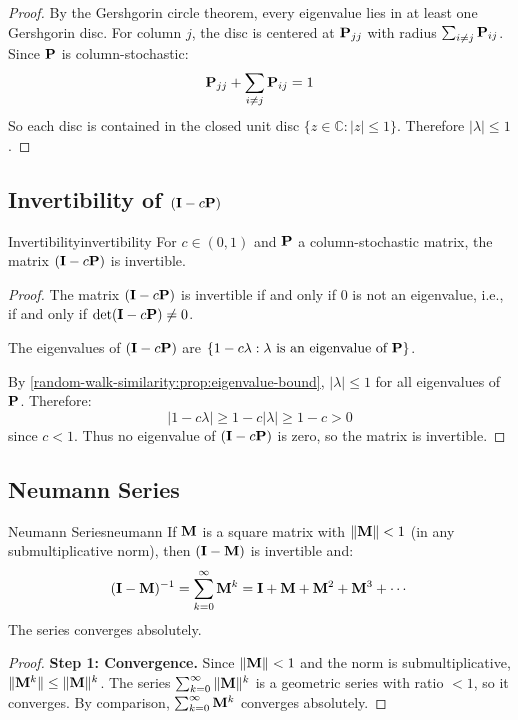 \begin{notechapter}
\begin{proof}
By the Gershgorin circle theorem, every eigenvalue lies in at least one Gershgorin disc. For column $j$, the disc is centered at $\mathbf{P}_{jj}$ with radius $\sum_{i \neq j} \mathbf{P}_{ij}$. Since $\mathbf{P}$ is column-stochastic:
\[
\mathbf{P}_{jj} + \sum_{i \neq j} \mathbf{P}_{ij} = 1
\]
So each disc is contained in the closed unit disc $\{z \in \mathbb{C} : |z| \leq 1\}$. Therefore $|\lambda| \leq 1$.
\end{proof}

\subsection{Invertibility of $(\mathbf{I} - c\mathbf{P})$}
\label{random-walk-similarity:app:invertibility}

\begin{proposition}{Invertibility}{invertibility}
For $c \in (0, 1)$ and $\mathbf{P}$ a column-stochastic matrix, the matrix $(\mathbf{I} - c\mathbf{P})$ is invertible.
\end{proposition}

\begin{proof}
The matrix $(\mathbf{I} - c\mathbf{P})$ is invertible if and only if $0$ is not an eigenvalue, i.e., if and only if $\det(\mathbf{I} - c\mathbf{P}) \neq 0$.

The eigenvalues of $(\mathbf{I} - c\mathbf{P})$ are $\{1 - c\lambda : \lambda \text{ is an eigenvalue of } \mathbf{P}\}$.

By \cref{random-walk-similarity:prop:eigenvalue-bound}, $|\lambda| \leq 1$ for all eigenvalues of $\mathbf{P}$. Therefore:
\[
|1 - c\lambda| \geq 1 - c|\lambda| \geq 1 - c > 0
\]
since $c < 1$. Thus no eigenvalue of $(\mathbf{I} - c\mathbf{P})$ is zero, so the matrix is invertible.
\end{proof}

\subsection{Neumann Series}
\label{random-walk-similarity:app:neumann}

\begin{theorem}{Neumann Series}{neumann}
If $\mathbf{M}$ is a square matrix with $\|\mathbf{M}\| < 1$ (in any submultiplicative norm), then $(\mathbf{I} - \mathbf{M})$ is invertible and:
\begin{equation}
(\mathbf{I} - \mathbf{M})^{-1} = \sum_{k=0}^{\infty} \mathbf{M}^k = \mathbf{I} + \mathbf{M} + \mathbf{M}^2 + \mathbf{M}^3 + \cdots
\end{equation}
The series converges absolutely.
\end{theorem}

\begin{proof}
\textbf{Step 1: Convergence.} Since $\|\mathbf{M}\| < 1$ and the norm is submultiplicative, $\|\mathbf{M}^k\| \leq \|\mathbf{M}\|^k$. The series $\sum_{k=0}^{\infty} \|\mathbf{M}\|^k$ is a geometric series with ratio $< 1$, so it converges. By comparison, $\sum_{k=0}^{\infty} \mathbf{M}^k$ converges absolutely.


\end{proof}
\end{notechapter}
